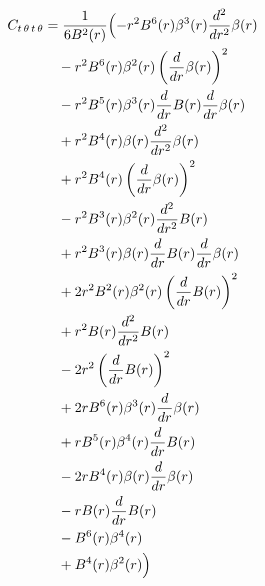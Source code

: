 \documentclass[11pt,a4paper]{article}
\begin{document}
\begin{align*}
  C_{t\,\theta\,t\,\theta} &= \frac{1}{6 B^{2}{\left(r \right)}}\Bigl(- r^{2} B^{6}{\left(r \right)} \beta^{3}{\left(r \right)} \frac{d^{2}}{d r^{2}} \beta{\left(r \right)} \\
  &\quad - r^{2} B^{6}{\left(r \right)} \beta^{2}{\left(r \right)} \left(\frac{d}{d r} \beta{\left(r \right)}\right)^{2} \\
  &\quad - r^{2} B^{5}{\left(r \right)} \beta^{3}{\left(r \right)} \frac{d}{d r} B{\left(r \right)} \frac{d}{d r} \beta{\left(r \right)} \\
  &\quad + r^{2} B^{4}{\left(r \right)} \beta{\left(r \right)} \frac{d^{2}}{d r^{2}} \beta{\left(r \right)} \\
  &\quad + r^{2} B^{4}{\left(r \right)} \left(\frac{d}{d r} \beta{\left(r \right)}\right)^{2} \\
  &\quad - r^{2} B^{3}{\left(r \right)} \beta^{2}{\left(r \right)} \frac{d^{2}}{d r^{2}} B{\left(r \right)} \\
  &\quad + r^{2} B^{3}{\left(r \right)} \beta{\left(r \right)} \frac{d}{d r} B{\left(r \right)} \frac{d}{d r} \beta{\left(r \right)} \\
  &\quad + 2 r^{2} B^{2}{\left(r \right)} \beta^{2}{\left(r \right)} \left(\frac{d}{d r} B{\left(r \right)}\right)^{2} \\
  &\quad + r^{2} B{\left(r \right)} \frac{d^{2}}{d r^{2}} B{\left(r \right)} \\
  &\quad - 2 r^{2} \left(\frac{d}{d r} B{\left(r \right)}\right)^{2} \\
  &\quad + 2 r B^{6}{\left(r \right)} \beta^{3}{\left(r \right)} \frac{d}{d r} \beta{\left(r \right)} \\
  &\quad + r B^{5}{\left(r \right)} \beta^{4}{\left(r \right)} \frac{d}{d r} B{\left(r \right)} \\
  &\quad - 2 r B^{4}{\left(r \right)} \beta{\left(r \right)} \frac{d}{d r} \beta{\left(r \right)} \\
  &\quad - r B{\left(r \right)} \frac{d}{d r} B{\left(r \right)} \\
  &\quad - B^{6}{\left(r \right)} \beta^{4}{\left(r \right)} \\
  &\quad + B^{4}{\left(r \right)} \beta^{2}{\left(r \right)}\Bigr)
\end{align*}
\end{document}
